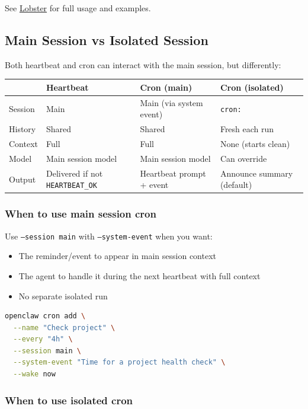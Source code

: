 See \href{/tools/lobster}{Lobster} for full usage and examples.

\subsection{Main Session vs Isolated Session}


Both heartbeat and cron can interact with the main session, but differently:


\begin{table}[h]
\centering
\small
\begin{tabular}{|l|l|l|l|}
\hline
 & Heartbeat & Cron (main) & Cron (isolated) \\
\hline
Session & Main & Main (via system event) & \texttt{cron:} \\
\hline
History & Shared & Shared & Fresh each run \\
\hline
Context & Full & Full & None (starts clean) \\
\hline
Model & Main session model & Main session model & Can override \\
\hline
Output & Delivered if not \texttt{HEARTBEAT\_OK} & Heartbeat prompt + event & Announce summary (default) \\
\hline
\end{tabular}
\end{table}



\subsubsection{When to use main session cron}


Use \texttt{--session main} with \texttt{--system-event} when you want:

\begin{itemize}
  \item The reminder/event to appear in main session context
  \item The agent to handle it during the next heartbeat with full context
  \item No separate isolated run
\end{itemize}


\begin{lstlisting}[language=bash]
openclaw cron add \
  --name "Check project" \
  --every "4h" \
  --session main \
  --system-event "Time for a project health check" \
  --wake now
\end{lstlisting}


\subsubsection{When to use isolated cron}


